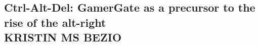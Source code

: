 \subsection*{Ctrl-Alt-Del: GamerGate as a precursor to the rise of the alt-right\\\textnormal{\MakeUppercase{Kristin MS Bezio}}}
\blindtext \par
\blindtext \par
\blindtext \par
\blindtext \par
\blindtext \par
\blindtext \par
\blindtext \par
\blindtext \par
\blindtext \par
\blindtext \par
\blindtext \par
\blindtext \par
